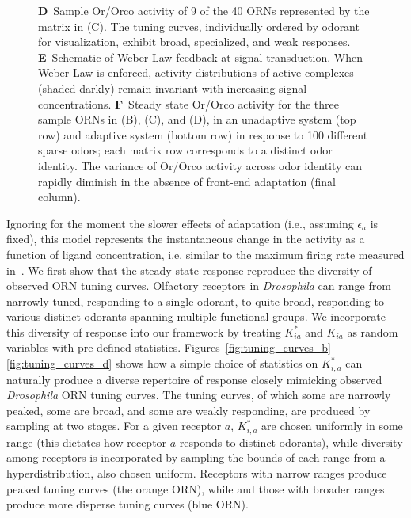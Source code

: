 \begin{figure}
{{		\textbf{D}~Sample Or/Orco activity of 9 of the 40 ORNs represented by the matrix in (C). The tuning curves, individually ordered by odorant for visualization, exhibit broad, specialized, and weak responses. 
		\textbf{E}~Schematic of Weber Law feedback at signal transduction. When Weber Law is enforced, activity distributions of active complexes (shaded darkly) remain invariant with increasing signal concentrations. 
		\textbf{F}~Steady state Or/Orco activity for the three sample ORNs in (B), (C), and (D), in an unadaptive system (top row) and adaptive system (bottom row) in response to 100 different sparse odors; each matrix row corresponds to a distinct odor identity. The variance of Or/Orco activity across odor identity can rapidly diminish in the absence of front-end adaptation (final column).
		}}
	\label{fig:tuning_curves}
\end{figure}

Ignoring for the moment the slower effects of adaptation (i.e., assuming $\epsilon_a$ is fixed), this model represents the instantaneous change in the activity as a function of ligand concentration, i.e. similar to the maximum firing rate measured in~\cite{hallem_carlson}. We first show that the steady state response reproduce the diversity of observed ORN tuning curves. Olfactory receptors in \textit{Drosophila} can range from narrowly tuned, responding to a single odorant, to quite broad, responding to various distinct odorants spanning multiple functional groups. We incorporate this diversity of response into our framework by treating $K^*_{ia}$ and $K_{ia}$ as random variables with pre-defined statistics. Figures~\ref{fig:tuning_curves_b}-\ref{fig:tuning_curves_d} shows how a simple choice of statistics on $K^*_{i, a}$ can naturally produce a diverse repertoire of response closely mimicking observed \textit{Drosophila} ORN tuning curves. The tuning curves, of which some are narrowly peaked, some are broad, and some are weakly responding, are produced by sampling at two stages. For a given receptor $a$, $K^*_{i,a}$ are chosen uniformly in some range (this dictates how receptor $a$ responds to distinct odorants), while diversity among receptors is incorporated by sampling the bounds of each range from a hyperdistribution, also chosen uniform. Receptors with narrow ranges produce peaked tuning curves (the orange ORN), while and those with broader ranges produce more disperse tuning curves (blue ORN). 

